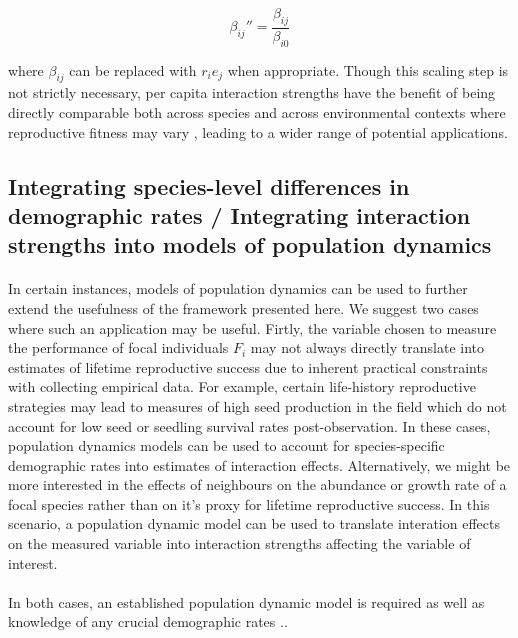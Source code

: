 \documentclass[a4,12pt]{article}
\begin{document}
        \begin{equation}
        {\beta_{ij}}'' = \frac{\beta_{ij}}{\beta_{i0}}
        \label{scaling}
        \end{equation}

        where $\beta_{ij}$ can be replaced with $r_i e_j$ when appropriate. Though this scaling step is not strictly necessary, per capita interaction strengths have the benefit of being directly comparable both across species and across environmental contexts where reproductive fitness may vary \parencite{Wootton2005}, leading to a wider range of potential applications.

    \subsection{Integrating species-level differences in demographic rates / Integrating interaction strengths into models of population dynamics}

        \paragraph{}
        In certain instances, models of population dynamics can be used to further extend the usefulness of the framework presented here. We suggest two cases where such an application may be useful. Firtly, the variable chosen to measure the performance of focal individuals $F_i$ may not always directly translate into estimates of lifetime reproductive success due to inherent practical constraints with collecting empirical data. For example, certain life-history reproductive strategies may lead to measures of high seed production in the field which do not account for low seed or seedling survival rates post-observation. In these cases, population dynamics models can be used to account for species-specific demographic rates into estimates of interaction effects. Alternatively, we might be more interested in the effects of neighbours on the abundance or growth rate of a focal species rather than on it's proxy for lifetime reproductive success. In this scenario, a population dynamic model can be used to translate interation effects on the measured variable into interaction strengths affecting the variable of interest.

        \paragraph{}
        In both cases, an established population dynamic model is required as well as knowledge of any crucial demographic rates ..
\end{document}
